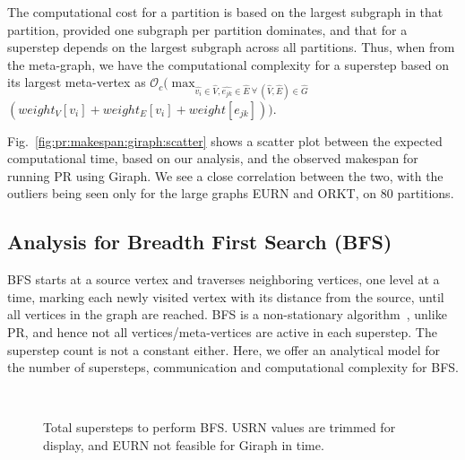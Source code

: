 \documentclass[10pt,conference, compsocconf]{IEEEtran}
\begin{document}
The computational cost for a partition is based on the largest subgraph in that partition, provided one subgraph per partition dominates, and that for a superstep depends on the largest subgraph across all partitions. Thus, when from the meta-graph, we have the computational complexity for a superstep based on its largest meta-vertex as  $\mathcal{O}_c\big(\max_{\widehat{v_i} \in \widehat{V}, \widehat{e_{jk}} \in \widehat{E}~\forall~(\widehat{V}, \widehat{E})\in \widehat{G} }$ $(weight_V[v_i] + weight_E[v_i] + weight[e_{jk}])\big)$.

Fig.~\ref{fig:pr:makespan:giraph:scatter} shows a scatter plot between the expected computational time, based on our analysis, and the observed makespan for running PR using Giraph. We see a close correlation between the two, with the outliers being seen only for the large graphs EURN and ORKT, on $80$ partitions.












\subsection{Analysis for Breadth First Search (BFS)}
\label{sec-ana-bfs}
BFS starts at a source vertex and traverses neighboring vertices, one level at a time, marking each newly visited vertex with its distance from the source, until all vertices in the graph are reached. BFS is a non-stationary algorithm~\cite{mizan}, unlike PR, and hence not all vertices/meta-vertices are active in each superstep. The superstep count is not a constant either. Here, we offer an analytical model for the number of supersteps, communication and computational complexity for BFS.


\begin{figure*}[t!]
\centering {}~~~~
\caption{Total supersteps to perform BFS. USRN values are trimmed for display, and EURN not feasible for Giraph in time.}
\label{fig:sstep:bfs}
\vspace{-0.1in}
\end{figure*}
\end{document}
